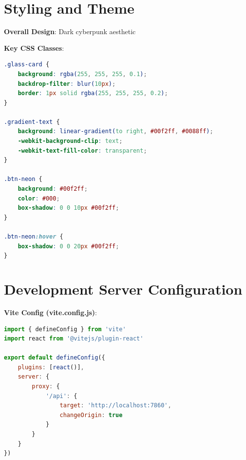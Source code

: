 \documentclass[12pt,a4paper]{book}
\begin{document}
\begin{itemize}
\section{Styling and Theme}

\textbf{Overall Design}: Dark cyberpunk aesthetic


\textbf{Key CSS Classes}:

\begin{lstlisting}[language=CSS]
.glass-card {
    background: rgba(255, 255, 255, 0.1);
    backdrop-filter: blur(10px);
    border: 1px solid rgba(255, 255, 255, 0.2);
}

.gradient-text {
    background: linear-gradient(to right, #00f2ff, #0088ff);
    -webkit-background-clip: text;
    -webkit-text-fill-color: transparent;
}

.btn-neon {
    background: #00f2ff;
    color: #000;
    box-shadow: 0 0 10px #00f2ff;
}

.btn-neon:hover {
    box-shadow: 0 0 20px #00f2ff;
}
\end{lstlisting}

\section{Development Server Configuration}

\textbf{Vite Config (vite.config.js)}:

\begin{lstlisting}[language=JavaScript]
import { defineConfig } from 'vite'
import react from '@vitejs/plugin-react'

export default defineConfig({
    plugins: [react()],
    server: {
        proxy: {
            '/api': {
                target: 'http://localhost:7860',
                changeOrigin: true
            }
        }
    }
})
\end{lstlisting}


\end{itemize}
\end{document}
